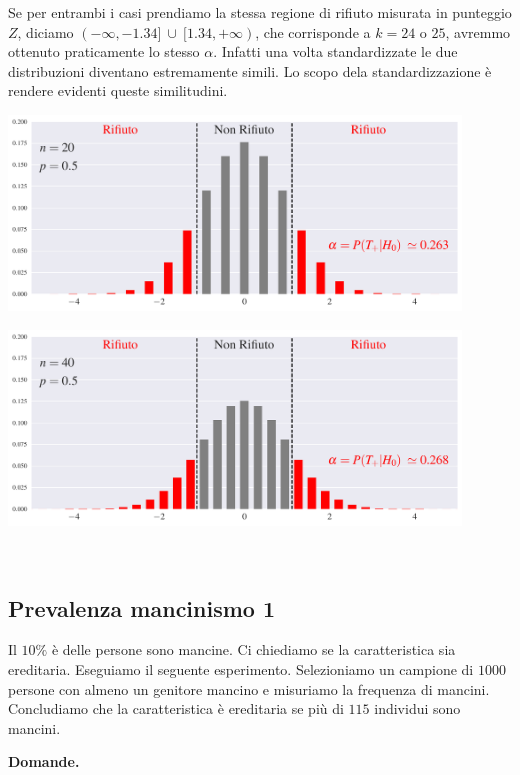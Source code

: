 \documentclass[11pt,openany]{book}
\begin{document}
Se per entrambi i casi prendiamo la stessa regione di rifiuto misurata in punteggio $Z$, diciamo $(-\infty, -1.34]\ \cup\ [1.34, +\infty)$, che corrisponde a $k=24$ o $25$,  avremmo ottenuto praticamente lo stesso $\alpha$. Infatti una volta standardizzate le due distribuzioni diventano estremamente simili. Lo scopo dela standardizzazione è rendere evidenti queste similitudini.  


\hfil\includegraphics[width=0.9\textwidth]{figure/B-test-standard2_01.pdf}

\hfil\includegraphics[width=0.9\textwidth]{figure/B-test-standard2_02.pdf}



\hfill{}\clearpage\
\subsection{Prevalenza mancinismo 1}

Il $10\%$ è delle persone sono mancine. Ci chiediamo se la caratteristica sia ereditaria. Eseguiamo il seguente esperimento. Selezioniamo un campione di $1000$ persone con almeno un genitore mancino e misuriamo la frequenza di mancini. Concludiamo che la caratteristica \`e ereditaria se pi\`u di $115$ individui sono mancini.

\textbf{Domande.}
\end{document}

